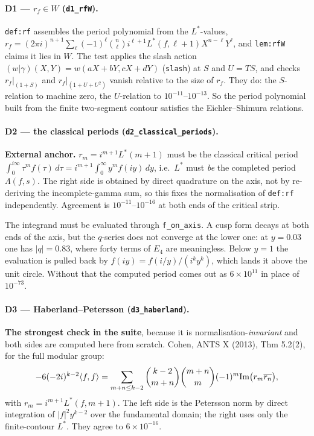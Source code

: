 \documentclass[11pt]{article}
\newcommand{\code}[1]{\texttt{#1}}
\begin{document}
\paragraph{D1 --- $r_f\in W$ (\code{d1\_rfW}).}
\code{def:rf} assembles the period polynomial from the $L^*$-values,
$r_f=(2\pi i)^{n+1}\sum_\ell(-1)^\ell\binom{n}{\ell}i^{\ell+1}L^*(f,\ell+1)X^{n-\ell}Y^\ell$, and
\code{lem:rfW} claims it lies in $W$. The test applies the slash action
$(w|\gamma)(X,Y)=w(aX+bY,cX+dY)$ (\code{slash}) at $S$ and $U=TS$, and checks
$r_f|_{(1+S)}$ and $r_f|_{(1+U+U^2)}$ vanish relative to the size of $r_f$. They do: the
$S$-relation to machine zero, the $U$-relation to $10^{-11}$--$10^{-13}$. So the period
polynomial built from the finite two-segment contour satisfies the Eichler--Shimura relations.

\paragraph{D2 --- the classical periods (\code{d2\_classical\_periods}).}
\textbf{External anchor.} $r_m=i^{m+1}L^*(m{+}1)$ must be the classical critical period
$\int_0^{i\infty}\tau^mf(\tau)\,d\tau=i^{m+1}\int_0^\infty y^mf(iy)\,dy$, i.e.\ $L^*$ must
\emph{be} the completed period $\Lambda(f,s)$. The right side is obtained by direct quadrature
on the axis, not by re-deriving the incomplete-gamma sum, so this fixes the normalisation of
\code{def:rf} independently. Agreement is $10^{-11}$--$10^{-16}$ at both ends of the critical
strip.

The integrand must be evaluated through \code{f\_on\_axis}. A cusp form decays at both ends of
the axis, but the $q$-series does not converge at the lower one: at $y=0.03$ one has
$|q|=0.83$, where forty terms of $E_4$ are meaningless. Below $y=1$ the evaluation is pulled
back by $f(iy)=f(i/y)/(i^ky^k)$, which lands it above the unit circle. Without that the
computed period comes out as $6\times10^{11}$ in place of $10^{-73}$.

\paragraph{D3 --- Haberland--Petersson (\code{d3\_haberland}).}
\textbf{The strongest check in the suite}, because it is normalisation-\emph{invariant} and
both sides are computed here from scratch. Cohen, ANTS X (2013), Thm 5.2(2), for the full
modular group:
\[
-6(-2i)^{k-2}\langle f,f\rangle=\sum_{m+n\le k-2}\binom{k-2}{m+n}\binom{m+n}{m}(-1)^m
{\rm Im}\big(r_m\overline{r_n}\big),
\]
with $r_m=i^{m+1}L^*(f,m{+}1)$. The left side is the Petersson norm by direct integration of
$|f|^2y^{k-2}$ over the fundamental domain; the right uses only the finite-contour $L^*$. They
agree to $6\times10^{-16}$.
\end{document}
